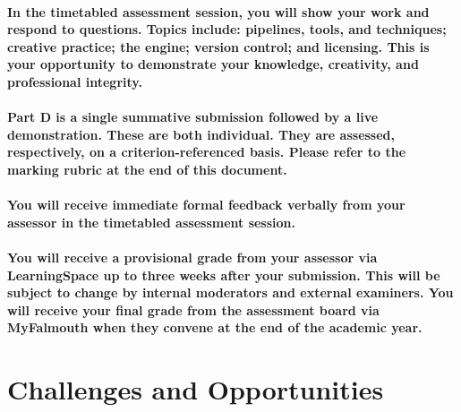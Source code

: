 \documentclass{../../fal_assignment}
\begin{document}
\paragraph{In the timetabled assessment session, you will show your work and respond to questions. Topics include: pipelines, tools, and techniques; creative practice; the engine; version control; and licensing. This is your opportunity to demonstrate your knowledge, creativity, and professional integrity.}


\paragraph{Part D is a \textbf{single summative submission} followed by a \textbf{live demonstration}. These are both \textbf{individual}. They are assessed, respectively, on a \textbf{criterion-referenced} basis. Please refer to the marking rubric at the end of this document.}

\paragraph{You will receive immediate \textbf{formal feedback} verbally from your \textbf{assessor} in the timetabled assessment session.}

\paragraph{You will receive a \textbf{provisional grade} from your \textbf{assessor} via LearningSpace up to three weeks after your submission. This will be subject to change by internal moderators and external examiners. You will receive your \textbf{final grade} from the \textbf{assessment board} via MyFalmouth when they convene at the end of the academic year.}


\section*{Challenges and Opportunities}
\end{document}

